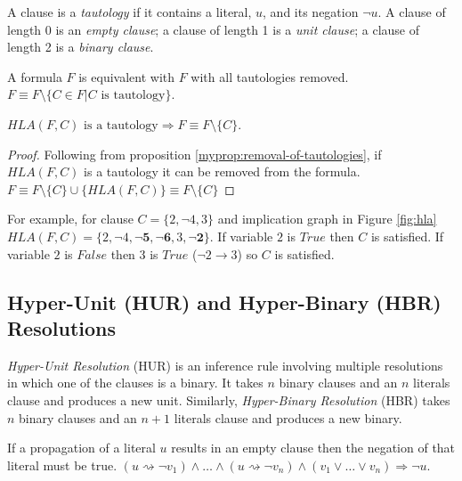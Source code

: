 \begin{mydef}
  A clause is a \emph{tautology} if it contains a literal, $u$, and its negation
  $\neg u$. A clause of length 0 is an \emph{empty clause}; a clause of length 1
  is a \emph{unit clause}; a clause of length 2 is a \emph{binary clause}. 
\end{mydef}

\begin{myprop}[TE]
  \label{myprop:removal-of-tautologies}
  A formula $F$ is equivalent with $F$ with all tautologies removed.
  $F \equiv F \setminus \{ C \in F | C \text{ is tautology}\}$.
\end{myprop}

\begin{myprop}[HTE]
  $HLA(F, C) \text{ is a tautology} \Rightarrow F \equiv F \setminus \{C\}$.
\end{myprop}

\begin{proof}
  Following from proposition \ref{myprop:removal-of-tautologies},
  if $HLA(F, C)$ is a tautology it can be removed from the formula.
  $F \equiv F \setminus \{C\} \cup \{HLA(F, C)\} \equiv F \setminus \{C\}$
\end{proof}

For example, for clause $C = \{ 2, \neg 4, 3\}$ and implication graph
in Figure \ref{fig:hla} $HLA(F, C) = \{2, \neg 4, \mathbf{\neg 5,
\neg 6}, 3, \mathbf{\neg 2} \}$.  If variable $2$ is $True$ then
$C$ is satisfied. If variable $2$ is $False$ then $3$ is $True$
($\neg 2 \rightarrow 3$) so $C$ is satisfied.


\subsection{Hyper-Unit (HUR) and Hyper-Binary (HBR) Resolutions}
\label{ssec:hbr}

\emph{Hyper-Unit Resolution} (HUR) \cite{Kusper02solvingthe} is an
inference rule involving multiple resolutions in which one of the
clauses is a binary. It takes $n$ binary clauses and an $n$ literals
clause and produces a new unit. Similarly, \emph{Hyper-Binary
Resolution} (HBR) \cite{Bacchus03effectivepreprocessing} takes
$n$ binary clauses and an $n + 1$ literals clause and produces a
new binary.

\begin{myprop}
  If a propagation of a literal $u$ results in an empty clause then
  the negation of that literal must be true.
  $(u \rightsquigarrow \neg v_1) \land \ldots
  \land (u \rightsquigarrow \neg v_n) \land (v_1 \lor \dots \lor v_n)
  \Rightarrow \neg u$. 
\end{myprop}

